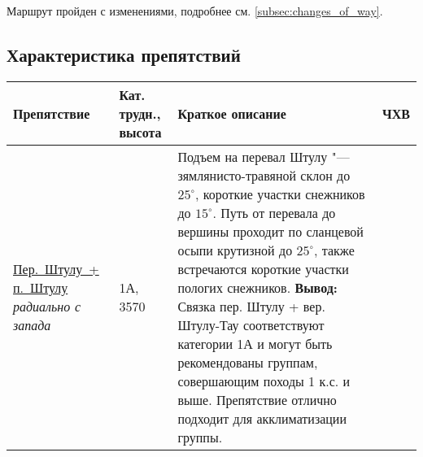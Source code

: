 		Маршрут пройден с изменениями, подробнее см. \ref{subsec:changes_of_way}.

	
	\subsection{Характеристика препятствий}\label{subsec:main_obstacles}

		\setlength{\arraycolsep}{0.5pt}
		\renewcommand{\arraystretch}{1}
		{\small\begin{longtable}{|>{\centering\arraybackslash}m{3.8cm}|>{\centering\arraybackslash}m{1.3cm}|>{\raggedright\arraybackslash}m{11.5cm}|>{\centering\arraybackslash}m{1cm}|} \hline
		 	Препятствие																																	&	Кат. трудн., высота			&	Краткое описание																																																																																																																																																																																										&	ЧХВ		\\ \hline
		 	\hyperref[subsec:Day2]{Пер.~Штулу~+ п.~Штулу}														\newline\textit{радиально с запада}		&	1А, 3570					&	Подъем на перевал Штулу "--- зямлянисто-травяной склон до $25^\circ$, короткие участки снежников до $15^\circ$. Путь от перевала до вершины проходит по сланцевой осыпи крутизной до $25^\circ$, также встречаются короткие участки пологих снежников. \newline \textbf{Вывод:} Связка пер. Штулу + вер. Штулу-Тау соответствуют категории 1А и могут быть рекомендованы группам, совершающим походы 1 к.с. и выше. Препятствие отлично подходит для акклиматизации группы. 																																																																																																																																																						&			\\ \hline

\end{longtable}}
